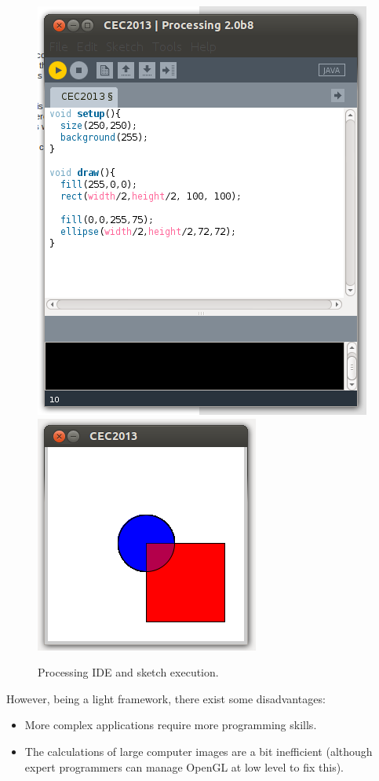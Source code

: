 {\begin{figure}
   \includegraphics[scale =0.55] {gfx/art/Processing.png}
   \includegraphics[scale =0.45] {gfx/art/run.png}

\label{fig:ideProc}
\caption{Processing IDE and sketch execution. }
\end{figure}

However, being a light framework, there exist some disadvantages:
\begin{itemize}
\item More complex applications require more programming skills.
\item The calculations of large computer images are a bit inefficient (although expert programmers can manage OpenGL at low level to fix this).
\end{itemize}

}
